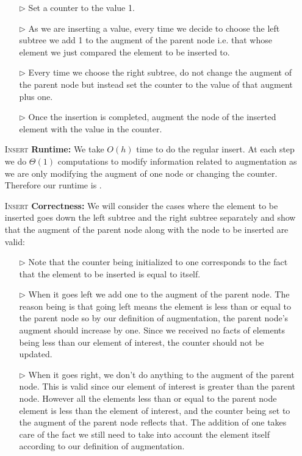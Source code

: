 \documentclass[12pt,twoside]{article}
\begin{document}
\begin{problems}
\begin{problemparts}
\begin{itemize}
\begin{itemize}
\item[$\rhd$] Set a counter to the value 1.
\item[$\rhd$] As we are inserting a value, every time we decide to choose the left subtree we add 1 to the augment of the parent node i.e. that whose element we just compared the element to be inserted to. 
\item[$\rhd$] Every time we choose the right subtree, do not change the augment of the parent node but instead set the counter to the value of that augment plus one.
\item[$\rhd$] Once the insertion is completed, augment the node of the inserted element with the value in the counter.
\end{itemize}
\item [\textsc{Insert}\textbf{ Runtime:}] We take $O(h)$ time to do the regular insert. At each step we do $\Theta(1)$ computations to modify information related to augmentation as we are only modifying the augment of one node or changing the counter. Therefore our runtime is .
\item [\textsc{Insert}\textbf{ Correctness:}] We will consider the cases where the element to be inserted goes down the left subtree and the right subtree separately and show that the augment of the parent node along with the node to be inserted are valid:
\begin{itemize}
\item[$\rhd$] Note that the counter being initialized to one corresponds to the fact that the element to be inserted is equal to itself.
\item[$\rhd$] When it goes left we add one to the augment of the parent node. The reason being is that going left means the element is less than or equal to the parent node so by our definition of augmentation, the parent node's augment should increase by one. Since we received no facts of elements being less than our element of interest, the counter should not be updated. 
\item[$\rhd$] When it goes right, we don't do anything to the augment of the parent node. This is valid since our element of interest is greater than the parent node. However all the elements less than or equal to the  parent node element is less than the element of interest, and the counter being set to the augment of the parent node reflects that. The addition of one takes care of the fact we still need to take into account the element itself according to our definition of augmentation.

\end{itemize}
\end{itemize}
\end{problemparts}
\end{problems}
\end{document}
